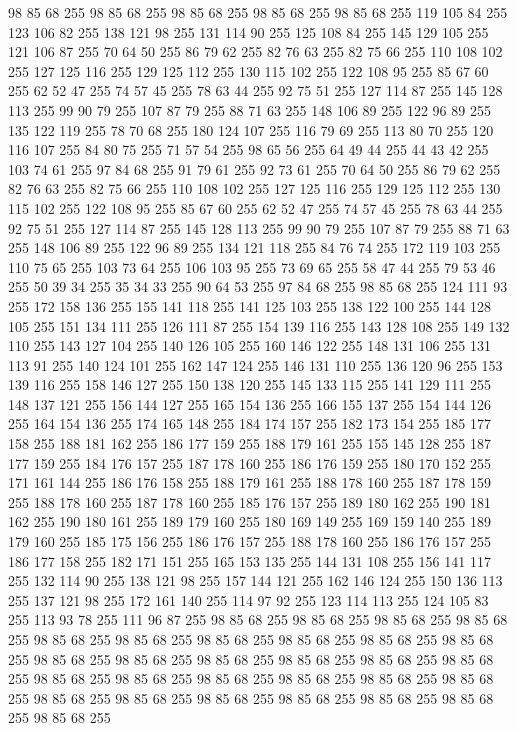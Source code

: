 98 85 68 255 98 85 68 255 98 85 68 255 98 85 68 255 98 85 68 255 119 105 84 255 123 106 82 255 138 121 98 255 131 114 90 255 125 108 84 255 145 129 105 255 121 106 87 255 70 64 50 255 86 79 62 255 82 76 63 255 82 75 66 255 110 108 102 255 127 125 116 255 129 125 112 255 130 115 102 255 122 108 95 255 85 67 60 255 62 52 47 255 74 57 45 255 78 63 44 255 92 75 51 255 127 114 87 255 145 128 113 255 99 90 79 255 107 87 79 255 88 71 63 255 148 106 89 255 122 96 89 255 135 122 119 255 78 70 68 255 180 124 107 255 116 79 69 255 113 80 70 255 120 116 107 255 84 80 75 255 71 57 54 255 98 65 56 255 64 49 44 255 44 43 42 255 103 74 61 255 97 84 68 255 91 79 61 255 92 73 61 255 70 64 50 255 86 79 62 255 82 76 63 255 82 75 66 255 110 108 102 255 127 125 116 255 129 125 112 255 130 115 102 255 122 108 95 255 85 67 60 255 62 52 47 255 74 57 45 255 78 63 44 255 92 75 51 255 127 114 87 255 145 128 113 255
99 90 79 255 107 87 79 255 88 71 63 255 148 106 89 255 122 96 89 255 134 121 118 255 84 76 74 255 172 119 103 255 110 75 65 255 103 73 64 255 106 103 95 255 73 69 65 255 58 47 44 255 79 53 46 255 50 39 34 255 35 34 33 255 90 64 53 255 97 84 68 255 98 85 68 255 124 111 93 255 172 158 136 255 155 141 118 255 141 125 103 255 138 122 100 255 144 128 105 255 151 134 111 255 126 111 87 255 154 139 116 255 143 128 108 255 149 132 110 255 143 127 104 255 140 126 105 255 160 146 122 255 148 131 106 255 131 113 91 255 140 124 101 255 162 147 124 255 146 131 110 255 136 120 96 255 153 139 116 255 158 146 127 255 150 138 120 255 145 133 115 255 141 129 111 255 148 137 121 255 156 144 127 255 165 154 136 255 166 155 137 255 154 144 126 255 164 154 136 255 174 165 148 255 184 174 157 255 182 173 154 255 185 177 158 255 188 181 162 255 186 177 159 255 188 179 161 255 155 145 128 255 187 177 159 255 184 176 157 255 187 178 160 255 186 176 159 255 180 170 152 255 171 161 144 255
186 176 158 255 188 179 161 255 188 178 160 255 187 178 159 255 188 178 160 255 187 178 160 255 185 176 157 255 189 180 162 255 190 181 162 255 190 180 161 255 189 179 160 255 180 169 149 255 169 159 140 255 189 179 160 255 185 175 156 255 186 176 157 255 188 178 160 255 186 176 157 255 186 177 158 255 182 171 151 255 165 153 135 255 144 131 108 255 156 141 117 255 132 114 90 255 138 121 98 255 157 144 121 255 162 146 124 255 150 136 113 255 137 121 98 255 172 161 140 255 114 97 92 255 123 114 113 255 124 105 83 255 113 93 78 255 111 96 87 255 98 85 68 255 98 85 68 255 98 85 68 255 98 85 68 255 98 85 68 255 98 85 68 255 98 85 68 255 98 85 68 255 98 85 68 255 98 85 68 255 98 85 68 255 98 85 68 255 98 85 68 255 98 85 68 255 98 85 68 255 98 85 68 255 98 85 68 255 98 85 68 255 98 85 68 255 98 85 68 255 98 85 68 255 98 85 68 255 98 85 68 255 98 85 68 255 98 85 68 255 98 85 68 255 98 85 68 255 98 85 68 255 98 85 68 255
